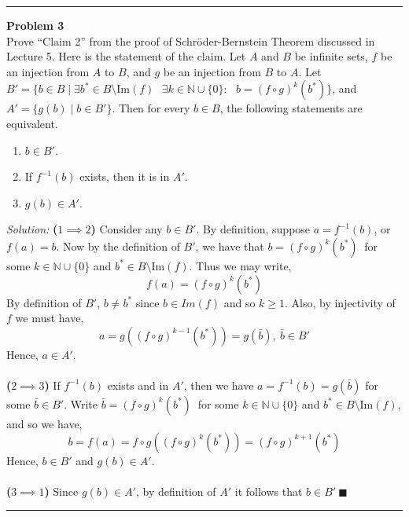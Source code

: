 \documentclass[a4paper, 11pt]{article}
\newenvironment{problem}[2][Problem]
    { \begin{mdframed}[backgroundcolor=gray!20] \textbf{#1 #2} \\}
    {  \end{mdframed}}
\newenvironment{solution}
    {\textit{Solution:}}
    {}
\newcommand{\hr}{\noindent\rule{7in}{2.8pt}}
\begin{document}
\hr

\begin{problem}{3}
Prove ``Claim 2'' from the proof of Schr\"{o}der-Bernstein Theorem discussed in Lecture 5. Here is the statement of the claim. Let $A$ and $B$ be infinite sets, $f$ be an injection from $A$ to $B$, and $g$ be an injection from $B$ to $A$. Let $B'=\{b\in B\mid\exists b^*\in B\setminus\text{Im}(f)\text{ }\exists k\in\mathbb{N}\cup\{0\}:\text{ }b=(f\circ g)^k(b^*)\}$, and $A'=\{g(b)\mid b\in B'\}$. Then for every $b\in B$, the following statements are equivalent.
\begin{enumerate}
\item $b\in B'$.
\item If $f^{-1}(b)$ exists, then it is in $A'$.
\item $g(b)\in A'$.
\end{enumerate}
\end{problem}
\begin{solution} \textbf{($1 \implies 2$)} Consider any $b \in B'$. By definition, suppose $a = f^{-1}(b)$, or $f(a) = b$. Now by the definition of $B'$, we have that $b= (f\circ g)^k(b^*)\ $ for some $k \in \mathbb{N}\cup \{0\}$ and $b^* \in B\setminus\text{Im}(f)$. Thus we may write, 
$$f(a) = (f\circ g)^k(b^*) $$
By definition of $B'$, $b \neq b^{*}$  since $b \in Im(f)$ and so $k \geq 1$. Also, by injectivity of $f$ we must have, 
$$a = g \left((f\circ g)^{k-1}(b^*)\right) = g(\bar{b}) , \  \bar{b} \in B'$$
Hence, $a \in A'$.
\\ 
\\
\textbf{($2 \implies 3$)} If $f^{-1}(b)$ exists and in $A'$, then we have $a=f^{-1}(b) = g(\bar{b})$ for some $\bar{b} \in B'$. Write $\bar{b}= (f\circ g)^k(b^*)\ $ for some $k \in \mathbb{N}\cup \{0\}$ and $b^* \in B\setminus\text{Im}(f)$, and so we have,
$$b = f(a) = f\circ g\left((f\circ g)^k(b^*)\right) = (f\circ g)^{k+1}(b^*)$$
Hence, $b \in B'$ and $g(b) \in A'$.
\\ 
\\
\textbf{($3 \implies 1$)} Since $g(b) \in A'$, by definition of $A'$ it follows that $b \in B' \ \blacksquare$
\end{solution} 
\\
\hr
\end{document}
